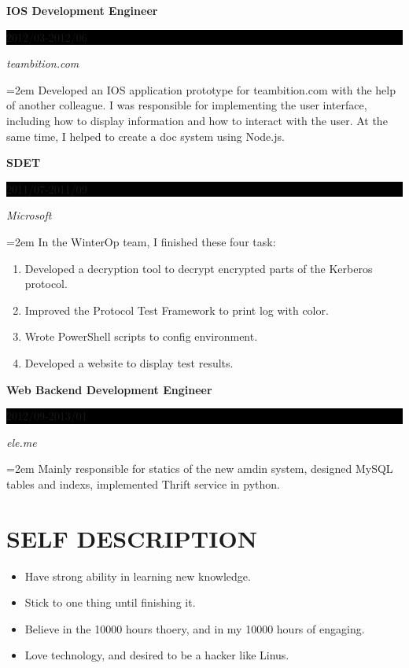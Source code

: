 \documentclass[paper=a4,fontsize=11pt]{scrartcl}	 			%
\newcommand{\sepspace}{\vspace*{1em}}			%
\newcommand{\NewPart}[1]{\section*{\uppercase{#1}}}
\newcommand{\EducationEntry}[4]{
		\noindent \textbf{#1} \hfill 					%
		\colorbox{Black}{%
			\parbox{8em}{%
			\hfill\color{White}#2}} \par				%
		\noindent \textit{#3} \par					%
		\noindent\hangindent=2em\hangafter=0  #4 	%
		\normalsize \par}
\begin{document}
\begin{CJK}{UTF8}{gbsn}
\sepspace

\EducationEntry{IOS Development Engineer}{2012/03-2012/06}{teambition.com}
{Developed an IOS application prototype for teambition.com with
the help of another colleague. I was responsible for implementing the user interface,
including how to display information and how to interact with the user.
At the same time, I helped to create a doc system using Node.js.
}
\sepspace

\EducationEntry{SDET}{2011/07-2011/09}{Microsoft}
{In the WinterOp team, I finished these four task:
\begin{enumerate}
        \item Developed a decryption tool to decrypt encrypted parts of the Kerberos protocol.
        \item Improved the Protocol Test Framework to print log with color. 
        \item Wrote PowerShell scripts to config environment.
        \item Developed a website to display test results.
\end{enumerate}
}
\sepspace

\EducationEntry{Web Backend Development Engineer}{2012/09-2013/01}{ele.me}
{Mainly responsible for statics of the new amdin system,
designed MySQL tables and indexs, implemented Thrift service in python.
}

\NewPart{Self Description}{}
\begin{itemize}
\item Have strong ability in learning new knowledge.
\item Stick to one thing until finishing it.
\item Believe in the 10000 hours thoery, and in my 10000 hours of engaging.
\item Love technology, and desired to be a hacker like Linus.
\end{itemize}
\end{CJK}
\end{document}
